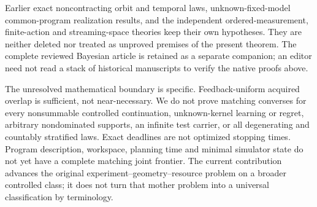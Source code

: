 Earlier exact noncontracting orbit and temporal laws, unknown-fixed-model common-program realization results, and the independent ordered-measurement, finite-action and streaming-space theories keep their own hypotheses. They are neither deleted nor treated as unproved premises of the present theorem. The complete reviewed Bayesian article is retained as a separate companion; an editor need not read a stack of historical manuscripts to verify the native proofs above.

The unresolved mathematical boundary is specific. Feedback-uniform acquired overlap is sufficient, not near-necessary. We do not prove matching converses for every nonsummable controlled continuation, unknown-kernel learning or regret, arbitrary nondominated supports, an infinite test carrier, or all degenerating and countably stratified laws. Exact deadlines are not optimized stopping times. Program description, workspace, planning time and minimal simulator state do not yet have a complete matching joint frontier. The current contribution advances the original experiment--geometry--resource problem on a broader controlled class; it does not turn that mother problem into a universal classification by terminology.
